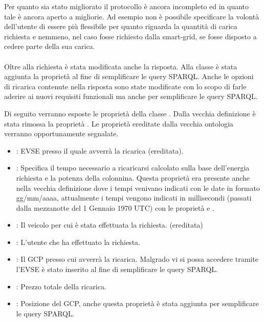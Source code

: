 \noindent
Per quanto sia stato migliorato il protocollo è ancora incompleto ed in quanto tale è ancora aperto a migliorie. Ad esempio non è possibile specificare la volontà dell'utente di essere più flessibile per quanto riguarda la quantità di carica richiesta e nemmeno, nel caso fosse richiesto dalla smart-grid, se fosse disposto a cedere parte della sua carica.
\\ \\
Oltre alla richiesta è stata modificata anche la risposta. Alla classe  è stata aggiunta la proprietà  al fine di semplificare le query SPARQL.
Anche le opzioni di ricarica contenute nella risposta sono state modificate con lo scopo di farle aderire ai nuovi requisiti funzionali ma anche per semplificare le query SPARQL.

Di seguito verranno esposte le proprietà della classe . Dalla vecchia definizione è stata rimossa la proprietà . Le proprietà ereditate dalla vecchia ontologia verranno opportunamente segnalate.

\begin{itemize}
	\item {}: EVSE presso il quale avverrà la ricarica (ereditata).
	\item {}: Specifica il tempo necessario a ricaricarsi calcolato sulla base dell'energia richiesta e la potenza della colonnina. Questa proprietà era presente anche nella vecchia definizione dove i tempi venivano indicati con le date in formato gg/mm/aaaa, attualmente i tempi vengono indicati in millisecondi (passati dalla mezzanotte del 1 Gennaio 1970 UTC) con le proprietà  e .
	\item {}: Il veicolo per cui è stata effettuata la richiesta. (ereditata)
	\item {}: L'utente che ha effettuato la richiesta.
	\item {}: Il GCP presso cui avverrà la ricarica. Malgrado vi si possa accedere tramite l'EVSE è stato inserito al fine di semplificare le query SPARQL.
	\item {}: Prezzo totale della ricarica.
	\item {}: Posizione del GCP, anche questa proprietà è stata aggiunta per semplificare le query SPARQL.
\end{itemize}


